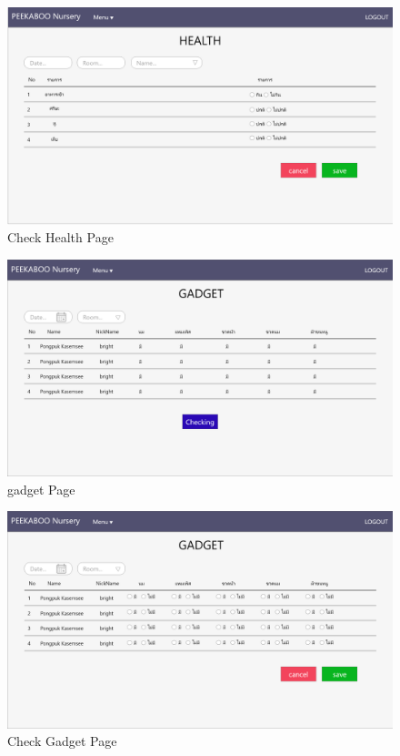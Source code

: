 \begin{figure}
  \begin{center}
  \includegraphics[width=140mm]{images/HealthPageChecking.png}
  \end{center}
  \caption[Poem]{Check Health Page}
  \label{fig:CheckHealth}
  \end{figure}

\begin{figure}
  \begin{center}
  \includegraphics[width=140mm]{images/gadgetPage.png}
  \end{center}
  \caption[Poem]{gadget Page}
  \label{fig:Gadget}
  \end{figure}

\begin{figure}
  \begin{center}
  \includegraphics[width=140mm]{images/gadgetPageChecking.png}
  \end{center}
  \caption[Poem]{Check Gadget Page}
  \label{fig:CheckGadget}
  \end{figure}

